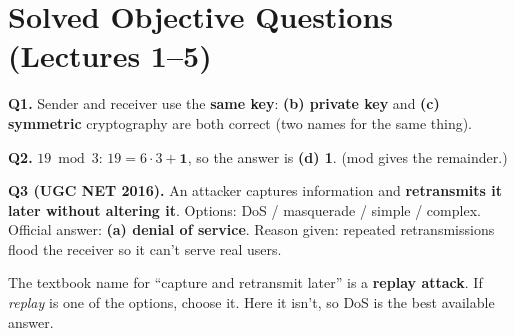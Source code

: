 \section{Solved Objective Questions (Lectures 1--5)}\label{q:06_solved}

\textbf{Q1.} Sender and receiver use the \textbf{same key}: \textbf{(b) private key} and \textbf{(c) symmetric} cryptography are both correct (two names for the same thing).

\textbf{Q2.} $19 \bmod 3$: $19 = 6 \cdot 3 + \mathbf{1}$, so the answer is \textbf{(d) 1}. (mod gives the remainder.)

\textbf{Q3 (UGC NET 2016).} An attacker captures information and \textbf{retransmits it later without altering it}. Options: DoS / masquerade / simple / complex. Official answer: \textbf{(a) denial of service}. Reason given: repeated retransmissions flood the receiver so it can't serve real users.
\begin{keybox}[title=Exam note]
The textbook name for ``capture and retransmit later'' is a \textbf{replay attack}. If \emph{replay} is one of the options, choose it. Here it isn't, so DoS is the best available answer.
\end{keybox}

